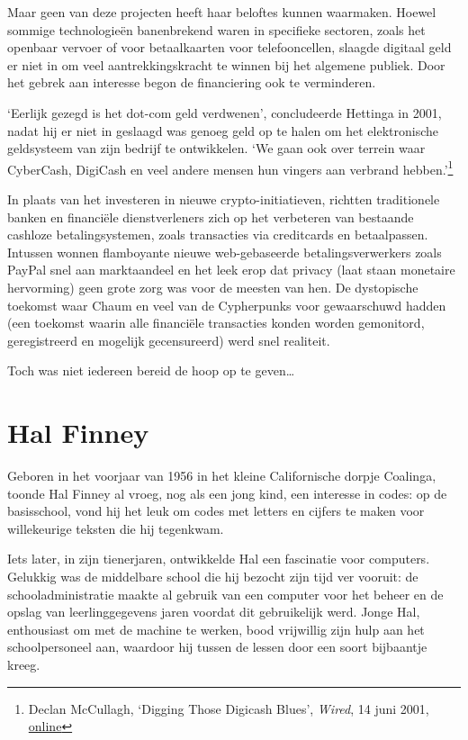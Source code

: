 \documentclass[smalldemyvopaper,11pt,twoside,onecolumn,openright,extrafontsizes,hidelinks]{memoir}
\begin{document}
Maar geen van deze projecten heeft haar beloftes kunnen waarmaken.
Hoewel sommige technologieën banenbrekend waren in specifieke sectoren,
zoals het openbaar vervoer of voor betaalkaarten voor telefooncellen,
slaagde digitaal geld er niet in om veel aantrekkingskracht te winnen
bij het algemene publiek. Door het gebrek aan interesse begon de
financiering ook te verminderen.

`Eerlijk gezegd is het dot-com geld verdwenen', concludeerde Hettinga in
2001, nadat hij er niet in geslaagd was genoeg geld op te halen om het
elektronische geldsysteem van zijn bedrijf te ontwikkelen. `We gaan ook
over terrein waar CyberCash, DigiCash en veel andere mensen hun vingers
aan verbrand hebben.'\footnote{Declan McCullagh, `Digging Those Digicash
  Blues', \emph{Wired}, 14 juni 2001,
  \href{https://www.wired.com/2001/06/digging-those-digicash-blues/}{online}}

In plaats van het investeren in nieuwe crypto-initiatieven, richtten
traditionele banken en financiële dienstverleners zich op het verbeteren
van bestaande cashloze betalingsystemen, zoals transacties via
creditcards en betaalpassen. Intussen wonnen flamboyante nieuwe
web-gebaseerde betalingsverwerkers zoals PayPal snel aan marktaandeel en
het leek erop dat privacy (laat staan \hspace{0pt}\hspace{0pt}monetaire
hervorming) geen grote zorg was voor de meesten van hen. De dystopische
toekomst waar Chaum en veel van de Cypherpunks voor gewaarschuwd hadden
(een toekomst waarin alle financiële transacties konden worden
gemonitord, geregistreerd en mogelijk gecensureerd) werd snel realiteit.

Toch was niet iedereen bereid de hoop op te geven\ldots{}

\section{Hal Finney}\label{hal-finney}

Geboren in het voorjaar van 1956 in het kleine Californische dorpje
Coalinga, toonde Hal Finney al vroeg, nog als een jong kind, een
interesse in codes: op de basisschool, vond hij het leuk om codes met
letters en cijfers te maken voor willekeurige teksten die hij tegenkwam.

Iets later, in zijn tienerjaren, ontwikkelde Hal een fascinatie voor
computers. Gelukkig was de middelbare school die hij bezocht zijn tijd
ver vooruit: de schooladministratie maakte al gebruik van een computer
voor het beheer en de opslag van leerlinggegevens jaren voordat dit
gebruikelijk werd. Jonge Hal, enthousiast om met de machine te werken,
bood vrijwillig zijn hulp aan het schoolpersoneel aan, waardoor hij
tussen de lessen door een soort bijbaantje kreeg.
\end{document}
